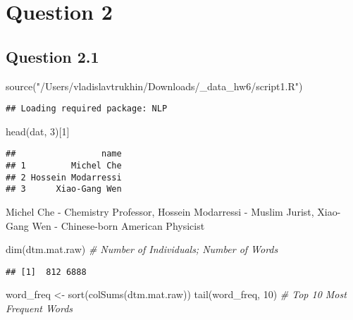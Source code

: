 \documentclass[
]{article}
\newenvironment{Shaded}{\begin{snugshade}}{\end{snugshade}}
\newcommand{\CommentTok}[1]{\textcolor[rgb]{0.56,0.35,0.01}{\textit{#1}}}
\newcommand{\DecValTok}[1]{\textcolor[rgb]{0.00,0.00,0.81}{#1}}
\newcommand{\FunctionTok}[1]{\textcolor[rgb]{0.00,0.00,0.00}{#1}}
\newcommand{\NormalTok}[1]{#1}
\newcommand{\OtherTok}[1]{\textcolor[rgb]{0.56,0.35,0.01}{#1}}
\newcommand{\StringTok}[1]{\textcolor[rgb]{0.31,0.60,0.02}{#1}}
\begin{document}
\hypertarget{question-2}{%
\section{Question 2}\label{question-2}}

\hypertarget{question-2.1}{%
\subsection{Question 2.1}\label{question-2.1}}

\begin{Shaded}
\begin{Highlighting}[]
\FunctionTok{source}\NormalTok{(}\StringTok{"/Users/vladislavtrukhin/Downloads/\_data\_hw6/script1.R"}\NormalTok{)}
\end{Highlighting}
\end{Shaded}

\begin{verbatim}
## Loading required package: NLP
\end{verbatim}

\begin{Shaded}
\begin{Highlighting}[]
\FunctionTok{head}\NormalTok{(dat, }\DecValTok{3}\NormalTok{)[}\DecValTok{1}\NormalTok{]}
\end{Highlighting}
\end{Shaded}

\begin{verbatim}
##                 name
## 1         Michel Che
## 2 Hossein Modarressi
## 3      Xiao-Gang Wen
\end{verbatim}

Michel Che - Chemistry Professor, Hossein Modarressi - Muslim Jurist,
Xiao-Gang Wen - Chinese-born American Physicist

\begin{Shaded}
\begin{Highlighting}[]
\FunctionTok{dim}\NormalTok{(dtm.mat.raw) }\CommentTok{\# Number of Individuals; Number of Words}
\end{Highlighting}
\end{Shaded}

\begin{verbatim}
## [1]  812 6888
\end{verbatim}

\begin{Shaded}
\begin{Highlighting}[]
\NormalTok{word\_freq }\OtherTok{\textless{}{-}} \FunctionTok{sort}\NormalTok{(}\FunctionTok{colSums}\NormalTok{(dtm.mat.raw))}
\FunctionTok{tail}\NormalTok{(word\_freq, }\DecValTok{10}\NormalTok{) }\CommentTok{\# Top 10 Most Frequent Words}
\end{Highlighting}
\end{Shaded}
\end{document}
